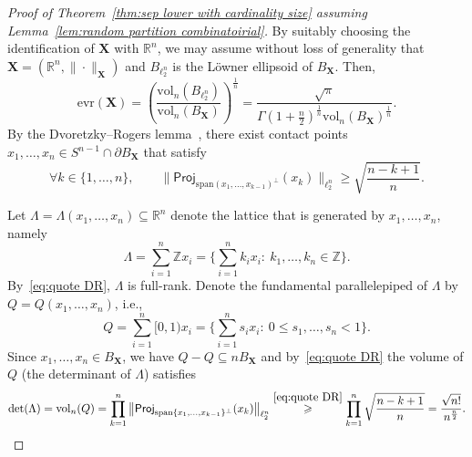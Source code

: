 \documentclass[11pt,reqno]{amsart}
\renewcommand{\le}{\leqslant}
\renewcommand{\ge}{\geqslant}
\newcommand{\evr}{\mathrm{evr}}
\renewcommand{\det}{\mathrm{det}}
\newcommand{\proj}{\mathsf{Proj}}
\newcommand{\X}{\mathbf X}
\newcommand{\R}{\mathbb R}
\theoremstyle{remark}
\renewcommand{\subset}{\subseteq}
\newcommand{\Z}{\mathbb Z}
\newcommand{\vol}{\mathrm{vol}}
\renewcommand{\1}{\mathbf 1}
\newcommand{\spn}{\mathrm{ span}}
\begin{document}
\begin{proof}[Proof of Theorem~\ref{thm:sep lower with cardinality size} assuming Lemma~\ref{lem:random partition combinatoirial}] By suitably choosing the identification of $\X$ with $\R^n$, we may assume without loss of generality that $\X=(\R^n,\|\cdot\|_\X)$  and  $B_{\ell_2^n}$ is the L\"owner ellipsoid of $B_\X$. Then,
\begin{equation}\label{eq:write evr}
\evr(\X)=\left(\frac{\vol_n(B_{\ell_2^n})}{\vol_n(B_\X)}\right)^{\frac{1}{n}}=\frac{\sqrt{\pi}}{ \Gamma\left(1+\frac{n}{2}\right)^{\frac{1}{n}}\vol_n(B_\X)^{\frac{1}{n}}}.
\end{equation}
By the Dvoretzky--Rogers lemma~\cite{DR50}, there exist contact points $x_1,\ldots, x_n\in S^{n-1}\cap \partial B_{\X}$ that satisfy
\begin{equation}\label{eq:quote DR}
\forall k\in \{1,\ldots, n\},\qquad \big\|\proj_{\spn(x_1,\ldots,x_{k-1})^\perp}(x_k)\big\|_{\ell_2^n}\ge \sqrt{\frac{n-k+1}{n}}.
\end{equation}

Let $\Lambda=\Lambda(x_1,\ldots,x_n)\subset \R^n$ denote the lattice that is generated by $x_1,\ldots,x_n$, namely
$$
\Lambda=\sum_{i=1}^n \Z x_i=\Big\{\sum_{i=1}^nk_i x_i:\ k_1,\ldots,k_n\in \Z\Big\}.
$$
By~\eqref{eq:quote DR}, $\Lambda$ is full-rank. Denote the fundamental parallelepiped of $\Lambda$ by $Q=Q(x_1,\ldots,x_n)$, i.e.,
$$
Q= \sum_{i=1}^n [0,1)x_i=\Big\{\sum_{i=1}^n s_ix_i:\ 0\le s_1,\ldots,s_n<1\Big\}.
$$
Since $x_1,\ldots,x_n\in B_\X$, we have $Q-Q\subset nB_\X$ and by~\eqref{eq:quote DR} the volume of $Q$ (the determinant of $\Lambda$) satisfies
\begin{equation}\label{eq:volume of Q}
\det(\Lambda)=\vol_n(Q)=\prod_{k=1}^n\big\|\proj_{\spn\{x_1,\ldots,x_{k-1}\}^\perp}(x_k)\big\|_{\ell_2^n} \stackrel{\eqref{eq:quote DR} }{\ge} \prod_{k=1}^n \sqrt{\frac{n-k+1}{n}}=\frac{\sqrt{n!}}{n^{\frac{n}{2}}}.
\end{equation}



\end{proof}
\end{document}

